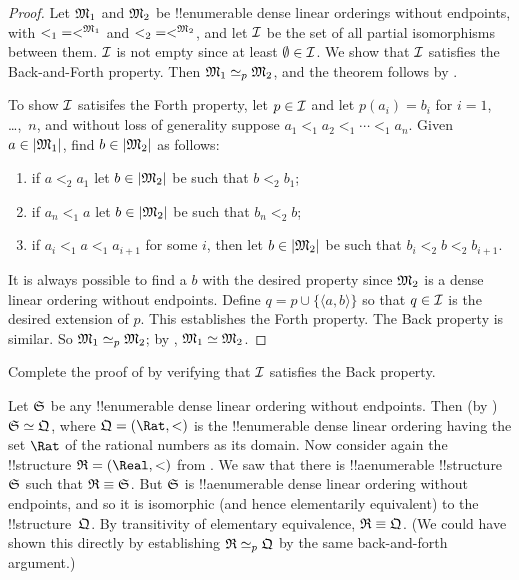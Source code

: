 \documentclass[../../include/open-logic-section]{subfiles}
\begin{document}
\begin{proof}
  Let $\mathfrak M_1$ and $\mathfrak M_2$ be !!{enumerable} dense linear
  orderings without endpoints, with ${<_1} = <^{\mathfrak M_1}$ and ${<_2} =
  <^{\mathfrak M_2}$, and let $\mathcal{I}$ be the set of all partial
  isomorphisms between them. $\mathcal{I}$ is not empty since at least
  $\emptyset \in \mathcal{I}$. We show that $\mathcal{I}$ satisfies the
  Back-and-Forth property.  Then $\Struct{M_1} \iso[p] \Struct{M_2}$,
  and the theorem follows by .

  To show $\mathcal{I}$ satisifes the Forth property, let $p \in
  \mathcal{I}$ and let $p(a_i) = b_i$ for $i = 1$, \dots,~$n$, and
  without loss of generality suppose $a_1 <_1 a_2 <_1 \cdots <_1
  a_n$. Given $a \in \left| \mathfrak M_1 \right|$, find $b \in \left| \mathfrak M_2 \right|$ as
  follows:
  \begin{enumerate}
  \item if $a <_2 a_1$ let $b \in \left| \mathfrak M_2 \right|$ be such that $b <_2
    b_1$;
  \item if $a_n <_1 a$ let $b \in \left| \mathfrak M_2 \right|$ be such that $b_n <_2 b$;
 \item if $a_i <_1 a <_1 a_{i+1}$ for some $i$, then let $b \in
   \left| \mathfrak M_2 \right|$ be such that $b_i <_2 b <_2 b_{i+1}$.
  \end{enumerate}
  It is always possible to find a $b$ with the desired property since
  $\mathfrak M_2$ is a dense linear ordering without endpoints. Define
  $q = p \cup \{ \langle a, b \rangle \}$ so that $q \in \mathcal{I}$ is
  the desired extension of $p$. This establishes the Forth
  property. The Back property is similar. So $\Struct{M_1} \iso[p]
  \Struct{M_2}$; by , $\Struct{M_1} \iso
  \Struct{M_2}$.
\end{proof}

\begin{prob}
  Complete the proof of  by
  verifying that $\mathcal{I}$ satisfies the Back property.
\end{prob}

\begin{rem}
  Let $\mathfrak S$ be any !!{enumerable} dense linear ordering without
  endpoints. Then (by ) $\Struct{S} \iso
  \Struct{Q}$, where $\Struct{Q} = (\Rat, <)$ is the !!{enumerable}
  dense linear ordering having the set $\Rat$ of the rational numbers
  as its domain. Now consider again the !!{structure} $\Struct{R} =
  (\Real, <)$ from . We saw that there is
  !!a{enumerable} !!{structure} $\mathfrak S$ such that $\Struct{R}
  \elemequiv \Struct{S}$. But $\mathfrak S$ is !!a{enumerable} dense
  linear ordering without endpoints, and so it is isomorphic (and
  hence elementarily equivalent) to the !!{structure}~$\mathfrak Q$. By
  transitivity of elementary equivalence, $\Struct{R} \elemequiv
  \Struct{Q}$. (We could have shown this directly by establishing
  $\Struct{R} \iso[p] \Struct{Q}$ by the same back-and-forth
  argument.)
\end{rem}
\end{document}
